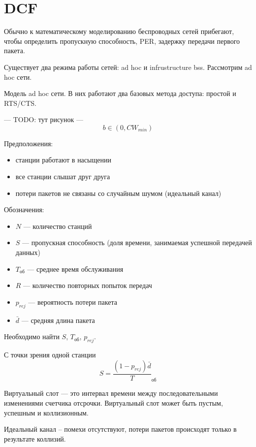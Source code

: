 \newcommand{\Tob}{T_\text{об}}
\newcommand{\prej}{p_{rej}}
\newcommand{\SIFS}{\text{SIFS}}
\newcommand{\EIFS}{\text{EIFS}}
\newcommand{\ACK}{\text{ACK}}
\newcommand{\DIFS}{\text{DIFS}}
\newcommand{\CTS}{\text{CTS}}
\newcommand{\RTS}{\text{RTS}}

\section{DCF}
Обычно к математическому моделированию беспроводных сетей прибегают, чтобы определить пропускную способность, PER, задержку передачи первого пакета.
  
Существует два режима работы сетей: ad hoc и infrustructure bss. Рассмотрим ad hoc сети.

Модель ad hoc сети. В них работают два базовых метода доступа: простой и RTS/CTS.

--- TODO: тут рисунок ---
\[ b \in (0, CW_{min}) \]

Предположения:
\begin{itemize}
\item станции работают в насыщении
\item все станции слышат друг друга
\item потери пакетов не связаны со случайным шумом (идеальный канал)
\end{itemize}

Обозначения:
\begin{itemize}
\item $N$ --- количество станций
\item $S$ --- пропускная способность (доля времени, занимаемая успешной передачей данных)
\item $\Tob$ --- среднее время обслуживания
\item $R$ --- количество повторных попыток передач
\item $\prej$ --- вероятность потери пакета
\item $\bar{d}$ --- средняя длина пакета
\end{itemize}

Необходимо найти $S$, $\Tob$, $\prej$.

С точки зрения одной станции
\[
S = \frac{(1 - \prej) \bar{d}}\Tob
\]

Виртуальный слот --- это интервал времени между последовательными изменениями счетчика отсрочки.  Виртуальный слот может быть пустым, успешным и коллизионным.

Идеальный канал -- помехи отсутствуют, потери пакетов происходят только в результате коллизий.

